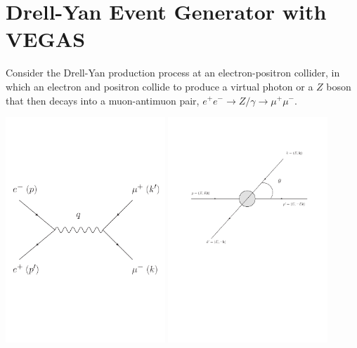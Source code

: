 \newpage
\section{Drell-Yan Event Generator with VEGAS}

Consider the Drell-Yan production process at an electron-positron collider, in which an electron and positron collide to produce a virtual photon or a $Z$ boson that then decays into a muon-antimuon pair, $e^+e^-\to Z/\gamma \to \mu^+\mu^-$.

\begin{center}
  \includegraphics[width=0.45\textwidth]{eemumu.pdf}
  \includegraphics[width=0.45\textwidth]{eemumukin.pdf}
\end{center}

